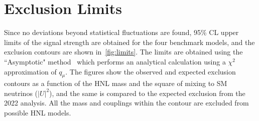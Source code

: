 \begin{table}[!htbp]
    \centering
    \caption{Percentage impact of uncertainties on the measured signal strength $\hat{\mu}$ for the 2QDH(IH) HNL model for representative mass and proper lifetimes at the edges and in the bulk of the sensitivity.}
    \label{tab:uncertainty}
\end{table}

\section{Exclusion Limits}\label{sec:limits}

Since no deviations beyond statistical fluctuations are found, 95\% CL upper limits of the signal strength are obtained for the four benchmark models, and the exclusion contours are shown in~\cref{fig:limits}. The limits are obtained using the ``Asymptotic" method~\cite{Cowan:2010js} which performs an analytical calculation using a $\chi^2$ approximation of $q_{\mu}$. The figures show the observed and expected exclusion contours as a function of the HNL mass and the square of mixing to SM neutrinos ($|U|^2$), and the same is compared to the expected exclusion from the 2022 analysis. All the mass and couplings within the contour are excluded from possible HNL models.

